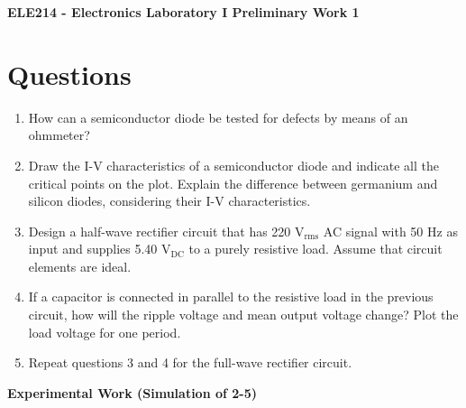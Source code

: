 \documentclass[11pt]{article}
\begin{document}
\begin{center}
\large
\textbf{ELE214 - Electronics Laboratory I Preliminary Work 1}
\end{center}

\section{Questions}

\begin{enumerate}[leftmargin=*,label=\textbf{\arabic*.}]

\item How can a semiconductor diode be tested for defects by means of an ohmmeter?

\item Draw the I-V characteristics of a semiconductor diode and indicate all the critical points on the plot. Explain the difference between germanium and silicon diodes, considering their I-V characteristics.

\item Design a half-wave rectifier circuit that has 220 V$_{\text{rms}}$ AC signal with 50 Hz as input and supplies 5.40 V$_{\text{DC}}$ to a purely resistive load. Assume that circuit elements are ideal.

\item If a capacitor is connected in parallel to the resistive load in the previous circuit, how will the ripple voltage and mean output voltage change? Plot the load voltage for one period.

\item Repeat questions 3 and 4 for the full-wave rectifier circuit.

\end{enumerate}

\textbf{Experimental Work (Simulation of 2-5)}
\end{document}
